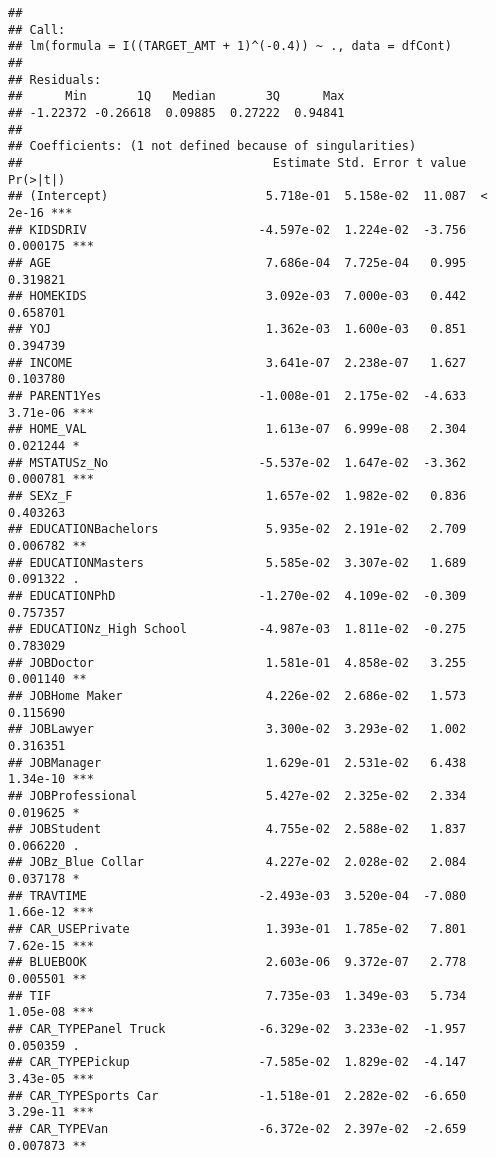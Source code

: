 \documentclass[]{article}
\begin{document}
\begin{verbatim}
## 
## Call:
## lm(formula = I((TARGET_AMT + 1)^(-0.4)) ~ ., data = dfCont)
## 
## Residuals:
##      Min       1Q   Median       3Q      Max 
## -1.22372 -0.26618  0.09885  0.27222  0.94841 
## 
## Coefficients: (1 not defined because of singularities)
##                                   Estimate Std. Error t value Pr(>|t|)    
## (Intercept)                      5.718e-01  5.158e-02  11.087  < 2e-16 ***
## KIDSDRIV                        -4.597e-02  1.224e-02  -3.756 0.000175 ***
## AGE                              7.686e-04  7.725e-04   0.995 0.319821    
## HOMEKIDS                         3.092e-03  7.000e-03   0.442 0.658701    
## YOJ                              1.362e-03  1.600e-03   0.851 0.394739    
## INCOME                           3.641e-07  2.238e-07   1.627 0.103780    
## PARENT1Yes                      -1.008e-01  2.175e-02  -4.633 3.71e-06 ***
## HOME_VAL                         1.613e-07  6.999e-08   2.304 0.021244 *  
## MSTATUSz_No                     -5.537e-02  1.647e-02  -3.362 0.000781 ***
## SEXz_F                           1.657e-02  1.982e-02   0.836 0.403263    
## EDUCATIONBachelors               5.935e-02  2.191e-02   2.709 0.006782 ** 
## EDUCATIONMasters                 5.585e-02  3.307e-02   1.689 0.091322 .  
## EDUCATIONPhD                    -1.270e-02  4.109e-02  -0.309 0.757357    
## EDUCATIONz_High School          -4.987e-03  1.811e-02  -0.275 0.783029    
## JOBDoctor                        1.581e-01  4.858e-02   3.255 0.001140 ** 
## JOBHome Maker                    4.226e-02  2.686e-02   1.573 0.115690    
## JOBLawyer                        3.300e-02  3.293e-02   1.002 0.316351    
## JOBManager                       1.629e-01  2.531e-02   6.438 1.34e-10 ***
## JOBProfessional                  5.427e-02  2.325e-02   2.334 0.019625 *  
## JOBStudent                       4.755e-02  2.588e-02   1.837 0.066220 .  
## JOBz_Blue Collar                 4.227e-02  2.028e-02   2.084 0.037178 *  
## TRAVTIME                        -2.493e-03  3.520e-04  -7.080 1.66e-12 ***
## CAR_USEPrivate                   1.393e-01  1.785e-02   7.801 7.62e-15 ***
## BLUEBOOK                         2.603e-06  9.372e-07   2.778 0.005501 ** 
## TIF                              7.735e-03  1.349e-03   5.734 1.05e-08 ***
## CAR_TYPEPanel Truck             -6.329e-02  3.233e-02  -1.957 0.050359 .  
## CAR_TYPEPickup                  -7.585e-02  1.829e-02  -4.147 3.43e-05 ***
## CAR_TYPESports Car              -1.518e-01  2.282e-02  -6.650 3.29e-11 ***
## CAR_TYPEVan                     -6.372e-02  2.397e-02  -2.659 0.007873 ** 

\end{verbatim}
\end{document}
